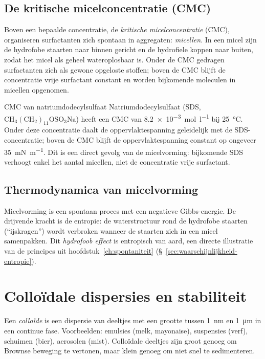 \subsection{De kritische micelconcentratie (CMC)}

Boven een bepaalde concentratie, de \emph{kritische micelconcentratie} (CMC), organiseren surfactanten zich spontaan in aggregaten: \emph{micellen}. In een micel zijn de hydrofobe staarten naar binnen gericht en de hydrofiele koppen naar buiten, zodat het micel als geheel wateroplosbaar is. Onder de CMC gedragen surfactanten zich als gewone opgeloste stoffen; boven de CMC blijft de concentratie vrije surfactant constant en worden bijkomende moleculen in micellen opgenomen.

\begin{voorbeeld}{CMC van natriumdodecylsulfaat}
Natriumdodecylsulfaat (SDS, $\mathrm{CH_3(CH_2)_{11}OSO_3Na}$) heeft een CMC van \SI{8.2e-3}{\mole\per\litre} bij \SI{25}{\celsius}. Onder deze concentratie daalt de oppervlaktespanning geleidelijk met de SDS-concentratie; boven de CMC blijft de oppervlaktespanning constant op ongeveer \SI{35}{\milli\newton\per\metre}. Dit is een direct gevolg van de micelvorming: bijkomende SDS verhoogt enkel het aantal micellen, niet de concentratie vrije surfactant.
\end{voorbeeld}

\subsection{Thermodynamica van micelvorming}

Micelvorming is een spontaan proces met een negatieve Gibbs-energie. De drijvende kracht is de entropie: de waterstructuur rond de hydrofobe staarten (``ijskragen'') wordt verbroken wanneer de staarten zich in een micel samenpakken. Dit \emph{hydrofoob effect} is entropisch van aard, een directe illustratie van de principes uit hoofdstuk~\ref{ch:spontaniteit} (\S~\ref{sec:waarschijnlijkheid-entropie}).

\section{Collo\"idale dispersies en stabiliteit}
\label{sec:colloiden}

Een \emph{collo\"ide} is een dispersie van deeltjes met een grootte tussen \SI{1}{\nano\metre} en \SI{1}{\micro\metre} in een continue fase. Voorbeelden: emulsies (melk, mayonaise), suspensies (verf), schuimen (bier), aerosolen (mist). Collo\"idale deeltjes zijn groot genoeg om Brownse beweging te vertonen, maar klein genoeg om niet snel te sedimenteren.

